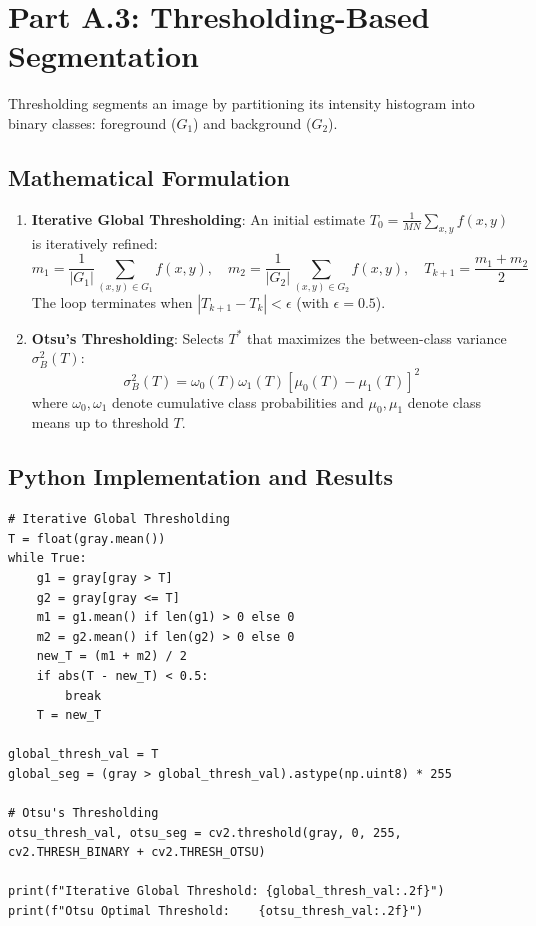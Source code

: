 \documentclass[12pt]{article}
\begin{document}
\section{Part A.3: Thresholding-Based Segmentation}

Thresholding segments an image by partitioning its intensity histogram into binary classes: foreground ($G_1$) and background ($G_2$).

\subsection{Mathematical Formulation}
\begin{enumerate}
    \item \textbf{Iterative Global Thresholding}:
    An initial estimate $T_0 = \frac{1}{MN}\sum_{x,y} f(x, y)$ is iteratively refined:
    \begin{equation}
    m_1 = \frac{1}{|G_1|} \sum_{(x,y) \in G_1} f(x, y), \quad m_2 = \frac{1}{|G_2|} \sum_{(x,y) \in G_2} f(x, y), \quad T_{k+1} = \frac{m_1 + m_2}{2}
    \end{equation}
    The loop terminates when $|T_{k+1} - T_k| < \epsilon$ (with $\epsilon = 0.5$).

    \item \textbf{Otsu's Thresholding}:
    Selects $T^*$ that maximizes the between-class variance $\sigma_B^2(T)$:
    \begin{equation}
    \sigma_B^2(T) = \omega_0(T) \omega_1(T) [\mu_0(T) - \mu_1(T)]^2
    \end{equation}
    where $\omega_0, \omega_1$ denote cumulative class probabilities and $\mu_0, \mu_1$ denote class means up to threshold $T$.
\end{enumerate}

\subsection{Python Implementation and Results}
\begin{lstlisting}[style=code]
# Iterative Global Thresholding
T = float(gray.mean())
while True:
    g1 = gray[gray > T]
    g2 = gray[gray <= T]
    m1 = g1.mean() if len(g1) > 0 else 0
    m2 = g2.mean() if len(g2) > 0 else 0
    new_T = (m1 + m2) / 2
    if abs(T - new_T) < 0.5:
        break
    T = new_T

global_thresh_val = T
global_seg = (gray > global_thresh_val).astype(np.uint8) * 255

# Otsu's Thresholding
otsu_thresh_val, otsu_seg = cv2.threshold(gray, 0, 255, cv2.THRESH_BINARY + cv2.THRESH_OTSU)

print(f"Iterative Global Threshold: {global_thresh_val:.2f}")
print(f"Otsu Optimal Threshold:    {otsu_thresh_val:.2f}")
\end{lstlisting}
\end{document}

